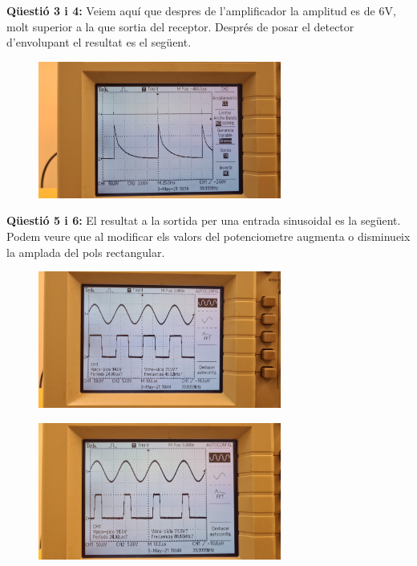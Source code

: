\documentclass[12pt, a4papre]{article}
\begin{document}
	\textbf{Qüestió 3 i 4:} Veiem aquí que despres de l'amplificador la amplitud es de 6V, molt superior a la que sortia del receptor. Després de posar el detector d'envolupant el resultat es el següent.
	
	\begin{figure}[H]
		\begin{center}
		\includegraphics[width=80mm]{p_4_4.jpeg}
		\end{center}
	\end{figure}
	
	
	
	\textbf{Qüestió 5 i 6:} El resultat a la sortida per una entrada sinusoidal es la següent. Podem veure que al modificar els valors del potenciometre augmenta o disminueix la amplada del pols rectangular.
	
	\begin{figure}[H]
		\begin{center}
		\includegraphics[width=80mm]{p4_6.jpeg}
		\end{center}
	\end{figure}
	
	\begin{figure}[H]
		\begin{center}
		\includegraphics[width=80mm]{p4_6_2.jpeg}
		\end{center}
	\end{figure}
	
\end{document}
